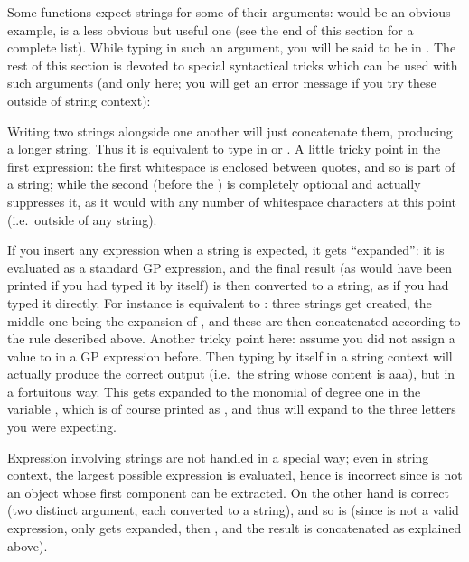 Some functions expect strings for some of their arguments:  would
be an obvious example,  is a less obvious but useful one (see the
end of this section for a complete list). While typing in such an argument,
you will be said to be in . The rest of this section is
devoted to special syntactical tricks which can be used with such arguments
(and only here; you will get an error message if you try these outside of
string context):

\item Writing two strings alongside one another will just concatenate
them, producing a longer string. Thus it is equivalent to type in
 or . A little tricky point in the first expression:
the first whitespace is enclosed between quotes, and so is part of a string;
while the second (before the ) is completely optional and 
actually suppresses it, as it would with any number of whitespace characters
at this point (i.e.~outside of any string).

\item If you insert any expression when a string is expected, it gets
``expanded'': it is evaluated as a standard GP expression, and the final
result (as would have been printed if you had typed it by itself) is then
converted to a string, as if you had typed it directly. For instance  is equivalent to : three strings get created, the middle
one being the expansion of , and these are then concatenated
according to the rule described above. Another tricky point here: assume you
did not assign a value to  in a GP expression before. Then typing
 by itself in a string context will actually produce the correct
output (i.e.~the string whose content is aaa), but in a fortuitous way. This
 gets expanded to the monomial of degree one in the variable
, which is of course printed as , and thus will expand to
the three letters you were expecting.

 Expression involving strings are not handled in a
special way; even in string context, the largest possible expression is
evaluated, hence  is incorrect since  is not an
object whose first component can be extracted. On the other hand
 is correct (two distinct argument, each converted to a
string), and so is  (since  is not a valid
expression, only  gets expanded, then , and the result is
concatenated as explained above).

